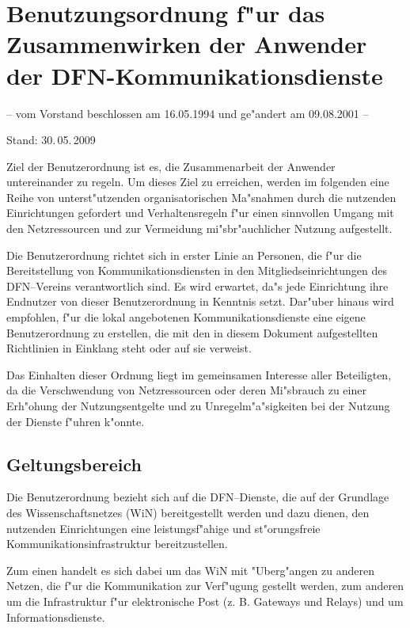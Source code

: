 
\section[DFN-Benutzungsordnung]{Benutzungsordnung f"ur das Zusammenwirken der Anwender der DFN-Kommunikationsdienste}
\label{dfn}

{\small -- vom Vorstand beschlossen am 16.05.1994 und ge"andert am 09.08.2001 --

Stand: 30.\,05.\,2009}

Ziel der Benutzerordnung ist es, die Zusammenarbeit der Anwender
untereinander zu regeln. Um dieses Ziel zu erreichen, werden im folgenden
eine Reihe von unterst"utzenden organisatorischen Ma"snahmen durch die
nutzenden Einrichtungen gefordert und Verhaltensregeln f"ur einen sinnvollen
Umgang mit den Netzressourcen und zur Vermeidung mi"sbr"auchlicher Nutzung
aufgestellt.

Die Benutzerordnung richtet sich in erster Linie an Personen, die f"ur die
Bereitstellung von Kommunikationsdiensten in den Mitgliedseinrichtungen des
DFN--Vereins verantwortlich sind. Es wird erwartet, da"s jede Einrichtung ihre
Endnutzer von dieser Benutzerordnung in Kenntnis setzt. Dar"uber hinaus wird
empfohlen, f"ur die lokal angebotenen Kommunikationsdienste eine eigene
Benutzerordnung zu erstellen, die mit den in diesem Dokument aufgestellten
Richtlinien in Einklang steht oder auf sie verweist.

Das Einhalten dieser Ordnung liegt im gemeinsamen Interesse aller
Beteiligten, da die Verschwendung von Netzressourcen oder deren Mi"sbrauch zu
einer Erh"ohung der Nutzungsentgelte und zu Unregelm"a"sigkeiten bei der
Nutzung der Dienste f"uhren k"onnte.

\subsection{Geltungsbereich}

Die Benutzerordnung bezieht sich auf die DFN--Dienste, die auf der Grundlage
des Wissenschaftsnetzes (WiN) bereitgestellt werden und dazu dienen, den
nutzenden Einrichtungen eine leistungsf"ahige und st"orungsfreie
Kommunikationsinfrastruktur bereitzustellen.

Zum einen handelt es sich dabei um das WiN mit "Uberg"angen zu anderen Netzen,
die f"ur die Kommunikation zur Verf"ugung gestellt werden, zum anderen um die
Infrastruktur f"ur elektronische Post (z. B. Gateways und Relays) und um
Informationsdienste.

